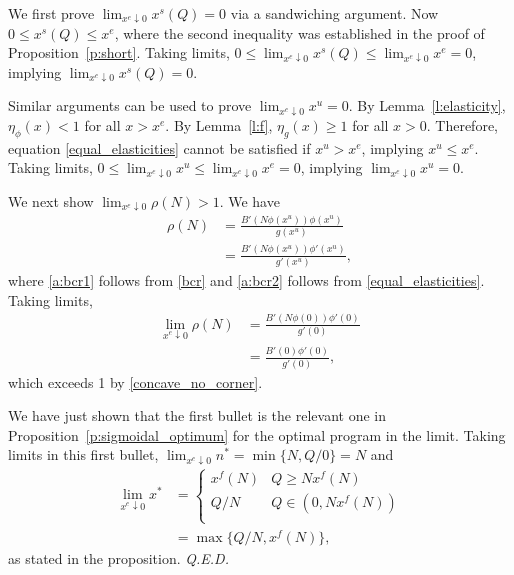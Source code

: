 \documentclass[12pt]{article}
\renewcommand{\qed}{{\it Q.E.D.}}
\newcommand{\efficacy}{\phi}
\newcommand{\general}{g}
\newcommand{\benefit}{B}
\newcommand{\ratio}{\rho(N)}
\newcommand{\xfull}{x^{f\!}}
\newcommand{\xshort}{x^{s}}
\newcommand{\xunit}{x^{e}}
\newcommand{\xun}{x^{u}}
\newcommand{\elasticity}[1]{\eta_{#1}}
\begin{document}
We first prove $\lim_{\xunit \downarrow 0} \xshort(Q) = 0$ via a sandwiching argument. Now $0 \leq \xshort(Q) \leq \xunit$, where the second inequality was established in the proof of Proposition~\ref{p:short}. Taking limits, $0 \leq \lim_{\xunit \downarrow 0} \xshort(Q) \leq \lim_{\xunit \downarrow 0} \xunit = 0$, implying $\lim_{\xunit \downarrow 0} \xshort(Q) = 0$.  

Similar arguments can be used to prove $\lim_{\xunit \downarrow 0} \xun = 0$. By Lemma~\ref{l:elasticity},  $\elasticity{\efficacy}(x) < 1$ for all $x > \xunit$. By Lemma~\ref{l:f}, $\elasticity{\general}(x) \geq 1$ for all $x > 0$. Therefore, equation \eqref{equal_elasticities} cannot be satisfied if $\xun > \xunit$, implying $\xun \leq \xunit$. Taking limits, $0 \leq \lim_{\xunit \downarrow 0} \xun \leq \lim_{\xunit \downarrow 0} \xunit = 0$, implying $\lim_{\xunit \downarrow 0} \xun = 0$.  

We next show $\lim_{\xunit \downarrow 0} \ratio > 1$. We have
\begin{align}
\ratio & = \frac{\benefit'(N\efficacy(\xun)) \efficacy(\xun)}{\general(\xun)} \label{a:bcr1} \\
& = \frac{\benefit'(N\efficacy(\xun)) \efficacy'(\xun)}{\general'(\xun)}, \label{a:bcr2}
\end{align}
where \eqref{a:bcr1} follows from \eqref{bcr} and \eqref{a:bcr2} follows from \eqref{equal_elasticities}. Taking limits,
\begin{align}
\lim_{\xunit \downarrow 0} \ratio & = \frac{\benefit'(N\efficacy(0)) \efficacy'(0)}{\general'(0)} \label{a:bcr3} \\
& = \frac{\benefit'(0) \efficacy'(0)}{\general'(0)}, \label{a:bcr4}
\end{align}
which exceeds 1 by \eqref{concave_no_corner}. 

We have just shown that the first bullet is the relevant one in Proposition~\ref{p:sigmoidal_optimum} for the optimal program in the limit. Taking limits in this first bullet, $\lim_{\xunit \downarrow 0} n^* = \min \{ N, Q/0 \} = N$ and
\begin{align}
\lim_{\xunit \downarrow 0} x^* & = \begin{cases}
\xfull(N) & Q \geq N \xfull(N) \\
Q/N & Q \in \left(0, N \xfull(N) \right) \\ 
\end{cases} \label{a:xnest1} \\
& = \max \{ Q/N, \xfull(N) \},
\end{align}
as stated in the proposition. \qed
\end{document}
